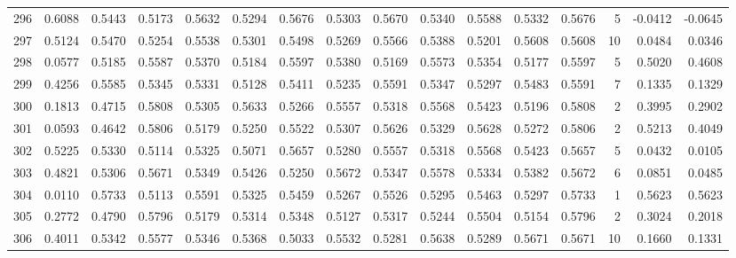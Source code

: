 \begin{tabular}{lrrrrrrrrrrrrrrr}
296 &      0.6088 &  0.5443 &  0.5173 &  0.5632 &  0.5294 &  0.5676 &  0.5303 &  0.5670 &  0.5340 &  0.5588 &   0.5332 &     0.5676 &      5 &                   -0.0412 &                    -0.0645 \\
297 &      0.5124 &  0.5470 &  0.5254 &  0.5538 &  0.5301 &  0.5498 &  0.5269 &  0.5566 &  0.5388 &  0.5201 &   0.5608 &     0.5608 &     10 &                    0.0484 &                     0.0346 \\
298 &      0.0577 &  0.5185 &  0.5587 &  0.5370 &  0.5184 &  0.5597 &  0.5380 &  0.5169 &  0.5573 &  0.5354 &   0.5177 &     0.5597 &      5 &                    0.5020 &                     0.4608 \\
299 &      0.4256 &  0.5585 &  0.5345 &  0.5331 &  0.5128 &  0.5411 &  0.5235 &  0.5591 &  0.5347 &  0.5297 &   0.5483 &     0.5591 &      7 &                    0.1335 &                     0.1329 \\
300 &      0.1813 &  0.4715 &  0.5808 &  0.5305 &  0.5633 &  0.5266 &  0.5557 &  0.5318 &  0.5568 &  0.5423 &   0.5196 &     0.5808 &      2 &                    0.3995 &                     0.2902 \\
301 &      0.0593 &  0.4642 &  0.5806 &  0.5179 &  0.5250 &  0.5522 &  0.5307 &  0.5626 &  0.5329 &  0.5628 &   0.5272 &     0.5806 &      2 &                    0.5213 &                     0.4049 \\
302 &      0.5225 &  0.5330 &  0.5114 &  0.5325 &  0.5071 &  0.5657 &  0.5280 &  0.5557 &  0.5318 &  0.5568 &   0.5423 &     0.5657 &      5 &                    0.0432 &                     0.0105 \\
303 &      0.4821 &  0.5306 &  0.5671 &  0.5349 &  0.5426 &  0.5250 &  0.5672 &  0.5347 &  0.5578 &  0.5334 &   0.5382 &     0.5672 &      6 &                    0.0851 &                     0.0485 \\
304 &      0.0110 &  0.5733 &  0.5113 &  0.5591 &  0.5325 &  0.5459 &  0.5267 &  0.5526 &  0.5295 &  0.5463 &   0.5297 &     0.5733 &      1 &                    0.5623 &                     0.5623 \\
305 &      0.2772 &  0.4790 &  0.5796 &  0.5179 &  0.5314 &  0.5348 &  0.5127 &  0.5317 &  0.5244 &  0.5504 &   0.5154 &     0.5796 &      2 &                    0.3024 &                     0.2018 \\
306 &      0.4011 &  0.5342 &  0.5577 &  0.5346 &  0.5368 &  0.5033 &  0.5532 &  0.5281 &  0.5638 &  0.5289 &   0.5671 &     0.5671 &     10 &                    0.1660 &                     0.1331 \\

\end{tabular}
